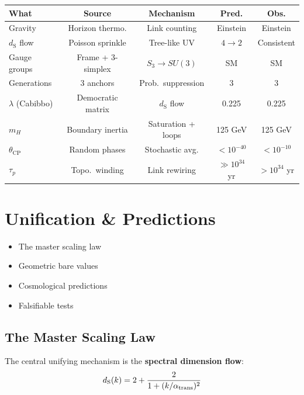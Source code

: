 \documentclass[11pt, a4paper, openany]{book}
\newcommand{\dS}{d_{\mathrm{S}}}
\newenvironment{introduction}[1][Chapter Overview]{%
  \begin{tcolorbox}[
    enhanced,
    colback=structurecolor!5,
    colframe=structurecolor,
    colbacktitle=structurecolor,
    coltitle=white,
    fonttitle=\bfseries,
    title={#1},
    arc=3pt, boxrule=1pt,
    left=10pt, right=10pt, top=8pt, bottom=8pt,
    before skip=15pt, after skip=15pt
  ]
  \begin{itemize}[leftmargin=*, itemsep=3pt]
}{%
  \end{itemize}
  \end{tcolorbox}
}
\begin{document}
\begin{center}
\small
\begin{tabular}{@{}lcccc@{}}
\toprule
\textbf{What} & \textbf{Source} & \textbf{Mechanism} & \textbf{Pred.} & \textbf{Obs.} \\
\midrule
Gravity & Horizon thermo. & Link counting & Einstein & Einstein \\
$\dS$ flow & Poisson sprinkle & Tree-like UV & $4 \to 2$ & Consistent \\
Gauge groups & Frame + 3-simplex & $S_3 \to SU(3)$ & SM & SM \\
Generations & 3 anchors & Prob.\ suppression & 3 & 3 \\
$\lambda$ (Cabibbo) & Democratic matrix & $\dS$ flow & 0.225 & 0.225 \\
$m_H$ & Boundary inertia & Saturation + loops & 125 GeV & 125 GeV \\
$\theta_{\text{CP}}$ & Random phases & Stochastic avg. & $<10^{-40}$ & $<10^{-10}$ \\
$\tau_p$ & Topo.\ winding & Link rewiring & $\gg 10^{34}$ yr & $>10^{34}$ yr \\
\bottomrule
\end{tabular}
\end{center}


\chapter{Unification \& Predictions}

\begin{introduction}
  \item The master scaling law
  \item Geometric bare values
  \item Cosmological predictions
  \item Falsifiable tests
\end{introduction}

\section{The Master Scaling Law}

The central unifying mechanism is the \textbf{spectral dimension flow}:
\begin{equation}
\dS(k) = 2 + \frac{2}{1 + (k / \alpha_{\rm trans})^2}
\end{equation}
\end{document}
